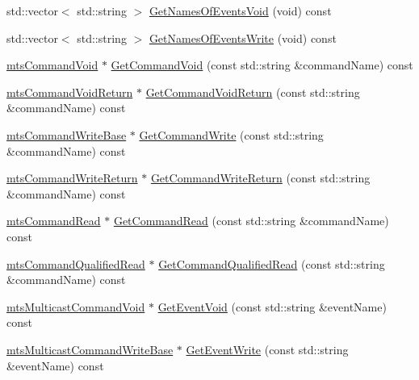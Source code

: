 {\bf }\par
\begin{DoxyCompactItemize}
\item 
std\+::vector$<$ std\+::string $>$ \hyperlink{classmts_interface_provided_ac1dee05fd82f4607bc1b2a0a8b712500}{Get\+Names\+Of\+Events\+Void} (void) const 
\item 
std\+::vector$<$ std\+::string $>$ \hyperlink{classmts_interface_provided_a46c1d7068e4f6351671d21774b1dd464}{Get\+Names\+Of\+Events\+Write} (void) const 
\end{DoxyCompactItemize}

{\bf }\par
\begin{DoxyCompactItemize}
\item 
\hyperlink{classmts_command_void}{mts\+Command\+Void} $\ast$ \hyperlink{classmts_interface_provided_ae34b95c5edc923c42b580958dfd252a9}{Get\+Command\+Void} (const std\+::string \&command\+Name) const 
\item 
\hyperlink{classmts_command_void_return}{mts\+Command\+Void\+Return} $\ast$ \hyperlink{classmts_interface_provided_a75946cdb4fd225075e1021fe5686de0f}{Get\+Command\+Void\+Return} (const std\+::string \&command\+Name) const 
\item 
\hyperlink{classmts_command_write_base}{mts\+Command\+Write\+Base} $\ast$ \hyperlink{classmts_interface_provided_a9162ce641167aa9ff88880ea44e0ebac}{Get\+Command\+Write} (const std\+::string \&command\+Name) const 
\item 
\hyperlink{classmts_command_write_return}{mts\+Command\+Write\+Return} $\ast$ \hyperlink{classmts_interface_provided_a5fcda2ac9cfefe653f765cc2d2aea374}{Get\+Command\+Write\+Return} (const std\+::string \&command\+Name) const 
\item 
\hyperlink{classmts_command_read}{mts\+Command\+Read} $\ast$ \hyperlink{classmts_interface_provided_a6f5af0ccb35820f663e65a556ef80472}{Get\+Command\+Read} (const std\+::string \&command\+Name) const 
\item 
\hyperlink{classmts_command_qualified_read}{mts\+Command\+Qualified\+Read} $\ast$ \hyperlink{classmts_interface_provided_a1e9e9d914bc355ceee89518e67b98de0}{Get\+Command\+Qualified\+Read} (const std\+::string \&command\+Name) const 
\end{DoxyCompactItemize}

{\bf }\par
\begin{DoxyCompactItemize}
\item 
\hyperlink{classmts_multicast_command_void}{mts\+Multicast\+Command\+Void} $\ast$ \hyperlink{classmts_interface_provided_a30544381f100800dd28de08ee35bba2f}{Get\+Event\+Void} (const std\+::string \&event\+Name) const 
\item 
\hyperlink{classmts_multicast_command_write_base}{mts\+Multicast\+Command\+Write\+Base} $\ast$ \hyperlink{classmts_interface_provided_aade47a65208a9ad651d0595b173eeec1}{Get\+Event\+Write} (const std\+::string \&event\+Name) const 
\end{DoxyCompactItemize}

